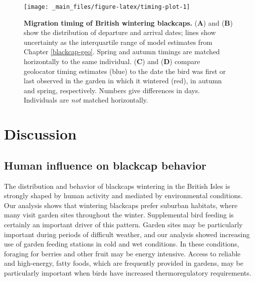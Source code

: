 \documentclass[a4paper, nobind]{templates/ociamthesis}
\begin{document}
\begin{figure}
\texttt{[image: \_main\_files/figure-latex/timing-plot-1]} \caption{\textbf{Migration timing of British wintering blackcaps.} (\textbf{A}) and (\textbf{B}) show the distribution of departure and arrival dates; lines show uncertainty as the interquartile range of model estimates from Chapter \ref{blackcap-geo}. Spring and autumn timings are matched horizontally to the same individual. (\textbf{C}) and (\textbf{D}) compare geolocator timing estimates (blue) to the date the bird was first or last observed in the garden in which it wintered (red), in autumn and spring, respectively. Numbers give differences in days. Individuals are \emph{not} matched horizontally.}\label{fig:timing-plot}
\end{figure}

\hypertarget{discussion}{%
\section{Discussion}\label{discussion}}

\hypertarget{human-influence-on-blackcap-behavior}{%
\subsection{Human influence on blackcap behavior}\label{human-influence-on-blackcap-behavior}}

The distribution and behavior of blackcaps wintering in the British Isles is strongly shaped by human activity and mediated by environmental conditions. Our analysis shows that wintering blackcaps prefer suburban habitats, where many visit garden sites throughout the winter. Supplemental bird feeding is certainly an important driver of this pattern. Garden sites may be particularly important during periods of difficult weather, and our analysis showed increasing use of garden feeding stations in cold and wet conditions. In these conditions, foraging for berries and other fruit may be energy intensive. Access to reliable and high-energy, fatty foods, which are frequently provided in gardens, may be particularly important when birds have increased thermoregulatory requirements.
\end{document}
